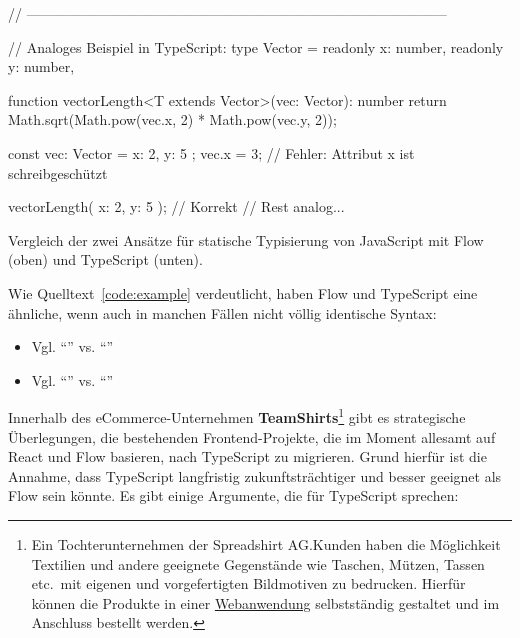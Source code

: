 \begin{listing}[!h]
\begin{tscode}
// ------------------------------------------------------------------------------------------

// Analoges Beispiel in TypeScript:
type Vector = {
  readonly x: number,
  readonly y: number,
}

function vectorLength<T extends Vector>(vec: Vector): number {
  return Math.sqrt(Math.pow(vec.x, 2) * Math.pow(vec.y, 2));
}

const vec: Vector = { x: 2, y: 5 };
vec.x = 3;                              // Fehler: Attribut x ist schreibgeschützt

vectorLength({ x: 2, y: 5 });           // Korrekt
// Rest analog...
\end{tscode}
\caption{Vergleich der zwei Ansätze für statische Typisierung von JavaScript mit Flow (oben) und TypeScript (unten).}
\label{code:example}
\end{listing}

\pagebreak
Wie Quelltext~\ref{code:example} verdeutlicht, haben Flow und TypeScript eine ähnliche, wenn auch in manchen Fällen nicht völlig identische Syntax:

\begin{itemize}
    \item Vgl. \enquote{} vs. \enquote{}
    \item Vgl. \enquote{} vs. \enquote{}
\end{itemize}

Innerhalb des eCommerce-Unternehmen \textbf{TeamShirts}\footnote{Ein Tochterunternehmen der Spreadshirt AG.\@ Kunden haben die Möglichkeit Textilien und andere geeignete Gegenstände wie Taschen, Mützen, Tassen etc.~mit eigenen und vorgefertigten Bildmotiven zu bedrucken. Hierfür können die Produkte in einer \href{https://wizard.teamshirts.de/de/DE/generic}{Webanwendung} selbstständig gestaltet und im Anschluss bestellt werden.} gibt es strategische Überlegungen, die bestehenden Frontend-Projekte, die im Moment allesamt auf React und Flow basieren, nach TypeScript zu migrieren. Grund hierfür ist die Annahme, dass TypeScript langfristig zukunftsträchtiger und besser geeignet als Flow sein könnte. Es gibt einige Argumente, die für TypeScript sprechen:

